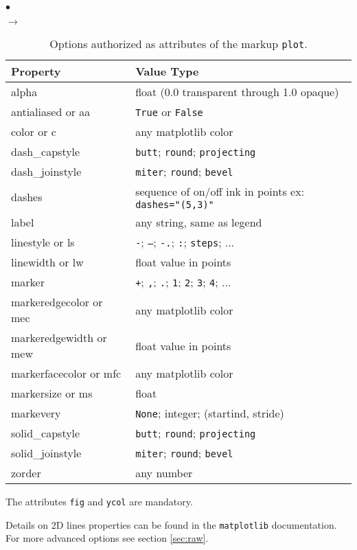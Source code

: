 \documentclass[a4paper,10pt,twoside]{article}
\begin{document}
\begin{list}{$\bullet$}{}
\begin{list}{$\rightarrow$}{}
\begin{table}[htbp]
\begin{center}
\begin{tabular}{|l|l|}
\hline
\textbf{Property} & \textbf{Value Type} \\
\hline
alpha & float (0.0 transparent through 1.0 opaque) \\
antialiased or aa & \texttt{True} or \texttt{False} \\
color or c & any matplotlib color \\
dash\_capstyle & \texttt{butt}; \texttt{round}; \texttt{projecting} \\
dash\_joinstyle & \texttt{miter}; \texttt{round}; \texttt{bevel} \\
dashes & sequence of on/off ink in points ex: \texttt{dashes="(5,3)"} \\
label & any string, same as legend\\
linestyle or ls &  \texttt{-}; \texttt{--}; \texttt{-.}; \texttt{:}; \texttt{steps}; ... \\
linewidth or lw & float value in points \\
marker &  \texttt{+}; \texttt{,}; \texttt{.}; \texttt{1}; \texttt{2}; \texttt{3}; \texttt{4}; ... \\
markeredgecolor or mec & any matplotlib color \\
markeredgewidth or mew & float value in points \\
markerfacecolor or mfc & any matplotlib color \\
markersize or ms & float \\
markevery & \texttt{None}; integer; (startind, stride) \\
solid\_capstyle & \texttt{butt}; \texttt{round}; \texttt{projecting} \\
solid\_joinstyle & \texttt{miter}; \texttt{round}; \texttt{bevel} \\
zorder & any number \\
\hline
\end{tabular}
\end{center}
\caption{Options authorized as attributes of the markup \texttt{plot}.}
\label{table:curves}
\end{table}

\end{list}
\end{list}

The attributes \texttt{fig} and \texttt{ycol} are mandatory.

Details on 2D lines properties can be found in the \texttt{matplotlib}
documentation. For more advanced options see section \ref{sec:raw}.
\end{document}
